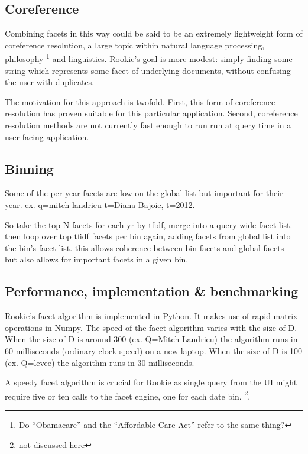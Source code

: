 \documentclass{article}
\begin{document}
\subsection{Coreference}

Combining facets in this way could be said to be an extremely lightweight form of coreference resolution, a large topic within natural language processing, philosophy \footnote{Do ``Obamacare'' and the ``Affordable Care Act'' refer to the same thing?} and linguistics. Rookie's goal is more modest: simply finding some string which represents some facet of underlying documents, without confusing the user with duplicates. 

The motivation for this approach is twofold. First, this form of coreference resolution has proven suitable for this particular application. Second, coreference resolution methods are not currently fast enough to run run at query time in a user-facing application.

\subsection{Binning}

Some of the per-year facets are low on the global list but important for their year. ex. q=mitch landrieu t=Diana Bajoie, t=2012.

So take the top N facets for each yr by tfidf, merge into a query-wide facet list. then loop over top tfidf facets per bin again, adding facets from global list into the bin's facet list. this allows coherence between bin facets and global facets -- but also allows for important facets in a given bin.


\subsection{Performance, implementation \& benchmarking}

Rookie's facet algorithm is implemented in Python. It makes use of rapid matrix operations in Numpy. The speed of the facet algorithm varies with the size of D. When the size of D is around 300 (ex. Q=Mitch Landrieu) the algorithm runs in 60 milliseconds (ordinary clock speed) on a new laptop. When the size of D is 100 (ex. Q=levee) the algorithm runs in 30 milliseconds. 

A speedy facet algorithm is crucial for Rookie as single query from the UI might require five or ten calls to the facet engine, one for each date bin. \footnote{not discussed here}.
\end{document}
